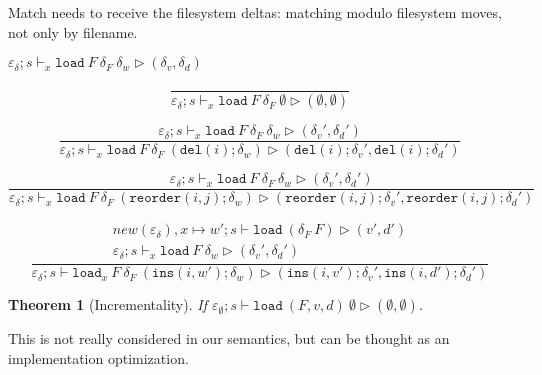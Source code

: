 \documentclass[10pt,twoside,a4paper]{article}
\theoremstyle{theorem}
\newtheorem{theorem}{Theorem}[section]
\theoremstyle{lemma}
\theoremstyle{property}
\begin{document}
Match needs to receive the filesystem deltas: matching modulo filesystem moves, not only by filename.

$\boxed{\varepsilon_\delta ; s \vdash_x \mathtt{load}~ F~ \delta_F~\delta_w \rhd (\delta_v,\delta_d)}$

\begin{displaymath}
	\frac{}
	{\varepsilon_\delta ; s \vdash_x \mathtt{load}~F~ \delta_F ~\emptyset \rhd (\emptyset,\emptyset)}
\end{displaymath}

\begin{displaymath}
	\frac{
		\varepsilon_\delta ; s \vdash_x \mathtt{load}~F~ \delta_F ~\delta_w \rhd (\delta_v',\delta_d')
	}
	{\varepsilon_\delta ; s \vdash_x \mathtt{load}~F~ \delta_F ~(\mathtt{del}(i);\delta_w) \rhd (\mathtt{del}(i);\delta_v',\mathtt{del}(i);\delta_d')}
\end{displaymath}

\begin{displaymath}
	\frac{
		\varepsilon_\delta ; s \vdash_x \mathtt{load}~F~ \delta_F ~\delta_w \rhd (\delta_v',\delta_d')
	}
	{\varepsilon_\delta ; s \vdash_x \mathtt{load}~F~ \delta_F ~(\mathtt{reorder}(i,j);\delta_w) \rhd (\mathtt{reorder}(i,j);\delta_v',\mathtt{reorder}(i,j);\delta_d')}
\end{displaymath}

\begin{displaymath}
	\frac{\begin{array}{c}
		new(\varepsilon_\delta),x \mapsto w' ; s \vdash \mathtt{load}~ (\delta_F ~F) \rhd (v',d')\\
		\varepsilon_\delta ; s \vdash_x \mathtt{load}~F~\delta_w \rhd (\delta_v',\delta_d')
	\end{array}}
	{\varepsilon_\delta ; s \vdash \mathtt{load}_x~F~ \delta_F ~(\mathtt{ins}(i,w');\delta_w) \rhd (\mathtt{ins}(i,v');\delta_v',\mathtt{ins}(i,d');\delta_d')}
\end{displaymath}

\begin{theorem}[Incrementality]
	If $\varepsilon_\emptyset ; s \vdash \mathtt{load}~ (F,v,d)~ \emptyset \rhd (\emptyset,\emptyset)$.
\end{theorem}
This is not really considered in our semantics, but can be thought as an implementation optimization.
\end{document}

